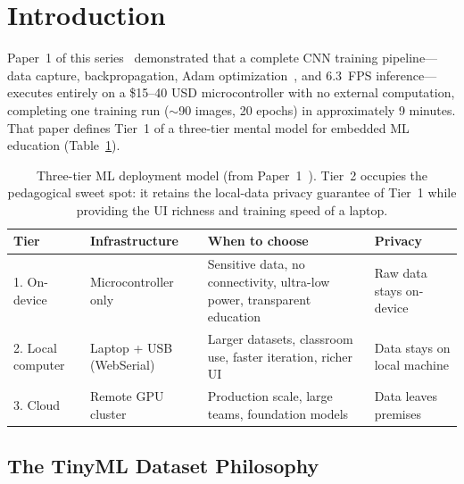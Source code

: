 \documentclass[11pt]{article}
\begin{document}
\tableofcontents

\newpage

\section{Introduction}

Paper~1 of this series~\cite{ellis2026ondevice} demonstrated that a complete CNN
training pipeline---data capture, backpropagation, Adam optimization~\cite{kingma2015adam}, and 6.3~FPS
inference---executes entirely on a \$15--40 USD microcontroller with no external
computation, completing one training run ($\sim$90 images, 20 epochs) in approximately
9 minutes. That paper defines Tier~1 of a three-tier mental model for embedded ML
education (Table~\ref{tab:tiers}).

\begin{table}[h]
\centering
\caption{Three-tier ML deployment model (from Paper~1~\cite{ellis2026ondevice}).
Tier~2 occupies the pedagogical sweet spot: it retains the local-data privacy guarantee
of Tier~1 while providing the UI richness and training speed of a laptop.}
\label{tab:tiers}
\begin{tabular}{@{}lp{3.4cm}p{4.2cm}l@{}}
\toprule
\textbf{Tier} & \textbf{Infrastructure} & \textbf{When to choose} & \textbf{Privacy} \\
\midrule
1. On-device      & Microcontroller only     & Sensitive data, no connectivity,
                                              ultra-low power, transparent education
                                            & Raw data stays on-device \\[4pt]
2. Local computer & Laptop + USB (WebSerial) & Larger datasets, classroom use,
                                              faster iteration, richer UI
                                            & Data stays on local machine \\[4pt]
3. Cloud          & Remote GPU cluster       & Production scale, large teams,
                                              foundation models
                                            & Data leaves premises \\
\bottomrule
\end{tabular}
\end{table}

\subsection{The TinyML Dataset Philosophy}
\end{document}
